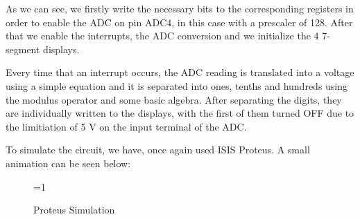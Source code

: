 \clearpage

As we can see, we firstly write the necessary bits to the corresponding registers in order to enable the ADC on pin ADC4, in this case with a prescaler of 128. After that we enable the interrupts, the ADC conversion and we initialize the 4 7-segment displays.\medskip

Every time that an interrupt occurs, the ADC reading is translated into a voltage using a simple equation and it is separated into ones, tenths and hundreds using the modulus operator and some basic algebra. After separating the digits, they are individually written to the displays, with the first of them turned OFF due to the limitiation of 5 V on the input terminal of the ADC. \medskip

To simulate the circuit, we have, once again used ISIS Proteus. A small animation can be seen below:


\begin{figure}[H]
    \centering
 
    \ifnum\value{ANIMATION}=1 {
    } 
    \fi
    
    \caption{Proteus Simulation}
    \label{fig:LM35_PROTEUS_MICROS}
\end{figure}


\clearpage

